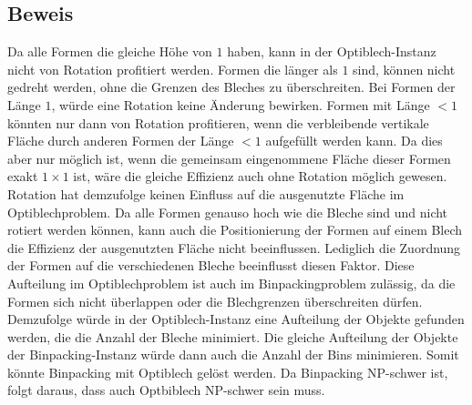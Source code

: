 \documentclass{scrartcl}
\begin{document}
\subsection*{Beweis}
Da alle Formen die gleiche H\"ohe von $1$ haben, kann in der Optiblech-Instanz nicht von Rotation profitiert werden. Formen die l\"anger als $1$ sind, k\"onnen nicht gedreht werden, ohne die Grenzen des Bleches zu \"uberschreiten. Bei Formen der L\"ange $1$, w\"urde eine Rotation keine \"Anderung bewirken. Formen mit L\"ange $<1$ k\"onnten nur dann von Rotation profitieren, wenn die verbleibende vertikale Fl\"ache durch anderen Formen der L\"ange $<1$ aufgef\"ullt werden kann. Da dies aber nur m\"oglich ist, wenn die gemeinsam eingenommene Fl\"ache dieser Formen exakt $1\times1$ ist, w\"are die gleiche Effizienz auch ohne Rotation m\"oglich gewesen. Rotation hat demzufolge keinen Einfluss auf die ausgenutzte Fl\"ache im Optiblechproblem. Da alle Formen genauso hoch wie die Bleche sind und nicht rotiert werden k\"onnen, kann auch die Positionierung der Formen auf einem Blech die Effizienz der ausgenutzten Fl\"ache nicht beeinflussen. Lediglich die Zuordnung der Formen auf die verschiedenen Bleche beeinflusst diesen Faktor. Diese Aufteilung im Optiblechproblem ist auch im Binpackingproblem zul\"assig, da die Formen sich nicht \"uberlappen oder die Blechgrenzen \"uberschreiten d\"urfen. Demzufolge w\"urde in der Optiblech-Instanz eine Aufteilung der Objekte gefunden werden, die die Anzahl der Bleche minimiert. Die gleiche Aufteilung der Objekte der Binpacking-Instanz w\"urde dann auch die Anzahl der Bins minimieren. Somit k\"onnte Binpacking mit Optiblech gel\"ost werden. Da Binpacking NP-schwer ist, folgt daraus, dass auch Optbiblech NP-schwer sein muss.
\end{document}
